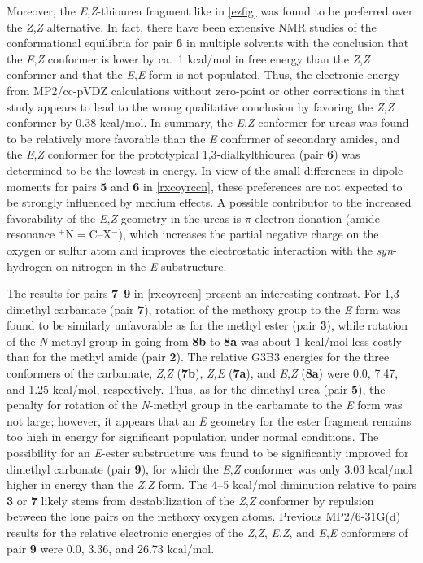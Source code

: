 \documentclass[12pt]{report}
\begin{document}
Moreover, the \textit{E},\textit{Z}-thiourea fragment like in \cref{ezfig} was found to be preferred over the \textit{Z},\textit{Z} alternative. In fact, there have been extensive NMR studies of the conformational equilibria for pair \textbf{6} in multiple solvents with the conclusion that the \textit{E},\textit{Z} conformer is lower by ca.\ 1 kcal/mol in free energy than the \textit{Z},\textit{Z} conformer and that the \textit{E},\textit{E} form is not populated.\cite{chambers} Thus, the electronic energy from MP2/cc-pVDZ calculations without zero-point or other corrections in that study appears to lead to the wrong qualitative conclusion by favoring the \textit{Z},\textit{Z} conformer by 0.38 kcal/mol.\cite{klebe} In summary, the \textit{E},\textit{Z} conformer for ureas was found to be relatively more favorable than the \textit{E} conformer of secondary amides, and the \textit{E},\textit{Z} conformer for the prototypical 1,3-dialkylthiourea (pair \textbf{6}) was determined to be the lowest in energy. In view of the small differences in dipole moments for pairs \textbf{5} and \textbf{6} in \cref{rxcoyrccn}, these preferences are not expected to be strongly influenced by medium effects. A possible contributor to the increased favorability of the \textit{E},\textit{Z} geometry in the ureas is 
$\pi$-electron donation (amide resonance $^+$N$=$C--X$^-$), which increases the partial negative charge on the oxygen or sulfur atom and improves the electrostatic interaction with the \textit{syn}-hydrogen on nitrogen in the \textit{E} substructure.

The results for pairs \textbf{7}--\textbf{9} in \cref{rxcoyrccn} present an interesting contrast. For 1,3-dimethyl carbamate (pair \textbf{7}), rotation of the methoxy group to the \textit{E} form was found to be similarly unfavorable as for the methyl ester (pair \textbf{3}), while rotation of the \textit{N}-methyl group in going from \textbf{8b} to \textbf{8a} was about 1 kcal/mol less costly than for the methyl amide (pair \textbf{2}). The relative G3B3 energies for the three conformers of the carbamate, \textit{Z},\textit{Z} (\textbf{7b}), \textit{Z,E} (\textbf{7a}), and \textit{E},\textit{Z} (\textbf{8a}) were 0.0, 7.47, and 1.25 kcal/mol, respectively. Thus, as for the dimethyl urea (pair \textbf{5}), the penalty for rotation of the \textit{N}-methyl group in the carbamate to the \textit{E} form was not large; however, it appears that an \textit{E} geometry for the ester fragment remains too high in energy for significant population under normal conditions. The possibility for an \textit{E}-ester substructure was found to be significantly improved for dimethyl carbonate (pair \textbf{9}), for which the \textit{E},\textit{Z} conformer was only 3.03 kcal/mol higher in energy than the \textit{Z},\textit{Z} form. The 4--5 kcal/mol diminution relative to pairs \textbf{3} or \textbf{7} likely stems from destabilization of the \textit{Z},\textit{Z} conformer by repulsion between the lone pairs on the methoxy oxygen atoms. Previous MP2/6-31G(d) results for the relative electronic energies of the \textit{Z},\textit{Z}, \textit{E},\textit{Z}, and \textit{E},\textit{E} conformers of pair \textbf{9} were 0.0, 3.36, and 26.73 kcal/mol.\cite{sun}
\end{document}
